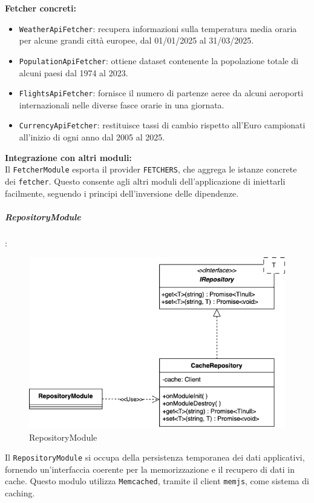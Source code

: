 \textbf{Fetcher concreti:}
\begin{itemize}
    \item \texttt{WeatherApiFetcher}: recupera informazioni sulla temperatura media oraria per alcune grandi città europee, dal 01/01/2025 al 31/03/2025.
    \item \texttt{PopulationApiFetcher}: ottiene dataset contenente la popolazione totale di alcuni paesi dal 1974 al 2023.
    \item \texttt{FlightsApiFetcher}: fornisce il numero di partenze aeree da alcuni aeroporti internazionali nelle diverse fasce orarie in una giornata.
    \item \texttt{CurrencyApiFetcher}: restituisce tassi di cambio rispetto all'Euro campionati all'inizio di ogni anno dal 2005 al 2025.
\end{itemize}

\textbf{Integrazione con altri moduli:} \\
Il \texttt{FetcherModule} esporta il provider \texttt{FETCHERS}, che aggrega le istanze concrete dei \texttt{fetcher}. Questo consente agli altri moduli dell’applicazione di iniettarli facilmente, seguendo i principi dell’inversione delle dipendenze.

\subparagraph{RepositoryModule}:

\begin{figure}[H] 
    \centering
    \includegraphics[scale = 0.5]{template/images/uml_back/RepositoryModule.png}
    \caption{RepositoryModule}
\end{figure}

Il \texttt{RepositoryModule} si occupa della persistenza temporanea dei dati applicativi, fornendo un’interfaccia coerente per la memorizzazione e il recupero di dati in cache. Questo modulo utilizza \texttt{Memcached}, tramite il client \texttt{memjs}, come sistema di caching.\\

